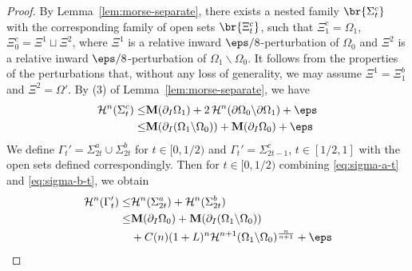 \begin{lemma}
\begin{proof}
        By Lemma~\ref{lem:morse-separate}, there exists a nested family $\br{\Sigma_t^c}$ with the corresponding family of open sets $\br{\Xi_t^c}$, such that $\Xi_1^c = \Omega_1$, $\Xi_0^c = \Xi^1\sqcup \Xi^2$, where $\Xi^1$ is a relative inward $\eps/8$-perturbation of $\Omega_0$ and $\Xi^2$ is a relative inward $\eps/8$-perturbation of $\Omega_1\backslash\Omega_0$. It follows from the properties of the perturbations that, without any loss of generality, we may assume $\Xi^1 = \Xi_1^b$ and $\Xi^2 = \Omega'$. By (3) of Lemma~\ref{lem:morse-separate}, we have
        \begin{equation*}
        \begin{split}
            \mathcal{H}^n(\Sigma_t^c) \leq& \mathbf{M}(\partial_I\Omega_1) + 2\,\mathcal{H}^n(\partial\Omega_0\backslash\partial\Omega_1) + \eps\\
            \leq& \mathbf{M}(\partial_I(\Omega_1\backslash\Omega_0)) + \mathbf{M}(\partial_I\Omega_0) + \eps
        \end{split}
        \end{equation*}
        We define $\Gamma_t' = \Sigma_{2t}^a\cup\Sigma_{2t}^b$ for $t \in [0, 1/2)$ and $\Gamma_t' = \Sigma_{2t - 1}^c$, $t \in [1/2, 1]$ with the open sets defined correspondingly. Then for $t \in [0, 1/2)$ combining \ref{eq:sigma-a-t} and \ref{eq:sigma-b-t}, we obtain
        \begin{equation*}
            \begin{split}
                \mathcal{H}^n(\Gamma_t') \leq&
                \mathcal{H}^n(\Sigma_{2t}^a) + \mathcal{H}^n(\Sigma_{2t}^b)\\
                \leq&  \mathbf{M}(\partial_I\Omega_0) + \mathbf{M}(\partial_I(\Omega_1\backslash\Omega_0))\\
                &+ C(n)(1 + L)^n\mathcal{H}^{n+1}(\Omega_1\backslash\Omega_0)^{\frac{n}{n + 1}} + \eps
            \end{split}
        \end{equation*}
    \end{proof}
\end{lemma}
